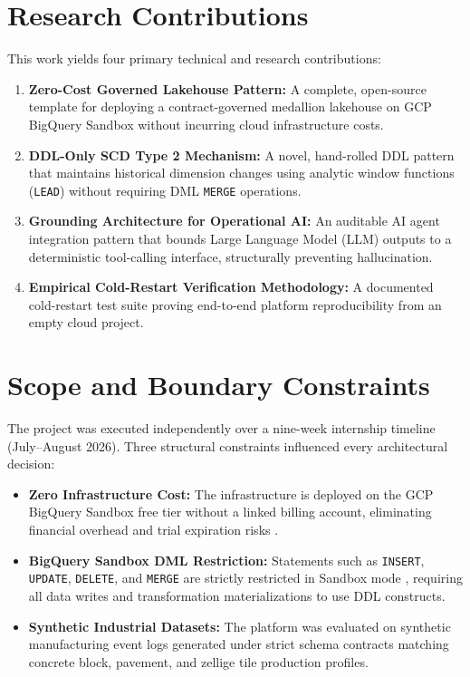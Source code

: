 \documentclass[12pt, a4paper]{report}
\begin{document}
\section{Research Contributions}
This work yields four primary technical and research contributions:
\begin{enumerate}
    \item \textbf{Zero-Cost Governed Lakehouse Pattern:} A complete, open-source template for deploying a contract-governed medallion lakehouse on GCP BigQuery Sandbox without incurring cloud infrastructure costs.
    \item \textbf{DDL-Only SCD Type 2 Mechanism:} A novel, hand-rolled DDL pattern that maintains historical dimension changes using analytic window functions (\texttt{LEAD}) without requiring DML \texttt{MERGE} operations.
    \item \textbf{Grounding Architecture for Operational AI:} An auditable AI agent integration pattern that bounds Large Language Model (LLM) outputs to a deterministic tool-calling interface, structurally preventing hallucination.
    \item \textbf{Empirical Cold-Restart Verification Methodology:} A documented cold-restart test suite proving end-to-end platform reproducibility from an empty cloud project.
\end{enumerate}

\section{Scope and Boundary Constraints}
The project was executed independently over a nine-week internship timeline (July--August 2026). Three structural constraints influenced every architectural decision:
\begin{itemize}
    \item \textbf{Zero Infrastructure Cost:} The infrastructure is deployed on the GCP BigQuery Sandbox free tier without a linked billing account, eliminating financial overhead and trial expiration risks \cite{google_bq_sandbox}.
    \item \textbf{BigQuery Sandbox DML Restriction:} Statements such as \texttt{INSERT}, \texttt{UPDATE}, \texttt{DELETE}, and \texttt{MERGE} are strictly restricted in Sandbox mode \cite{google_bq_dml_pricing}, requiring all data writes and transformation materializations to use DDL constructs.
    \item \textbf{Synthetic Industrial Datasets:} The platform was evaluated on synthetic manufacturing event logs generated under strict schema contracts matching concrete block, pavement, and zellige tile production profiles.
\end{itemize}
\end{document}
